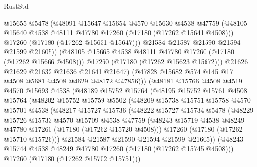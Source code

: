 \begin{lexlean}{RustStd}
\begin{coremodule}
{\begin{coremodule}
{{{{{{{{{{{{{{{{{{{{{{{{{{{{{{{{{{{{{{{{{{{{{{{{{{{{{{{                      @15655
                      @5478
                      (@48091
                        @15647
                        @15654
                        @4570
                        @15630
                        @4538
                        @47759
                        (@48105 @15640 @4538 @48111 @47780 @17260 (@17180 (@17262 @15641 @4508)))
                        @17260
                        (@17180 (@17262 @15631 @15647)))
                      @21584
                      @21587
                      @21590
                      @21594
                      @21599
                      @21605))
                  (@48105 @15665 @4538 @48111 @47780 @17260 (@17180 (@17262 @15666 @4508)))
                  @17260
                  (@17180 (@17262 @15623 @15672)))
                @21626
                @21629
                @21632
                @21636
                @21641
                @21647)
              (@47828 @15682 @574 @145 @17 @4508 @5681 @4508 @4629 @48172 @47856)))
          (@48181
            @15766
            @4508
            @4519
            @4570
            @15693
            @4538
            (@48189
              @15752
              @15764
              (@48195
                @15752
                @15761
                @4508
                @15764
                (@48202
                  @15752
                  @15759
                  @5502
                  (@48209
                    @15738
                    @15751
                    @15758
                    @4570
                    @15701
                    @4538
                    (@48217
                      @15727
                      @15736
                      (@48222
                        @15727
                        @15734
                        @5478
                        (@48229
                          @15726
                          @15733
                          @4570
                          @15709
                          @4538
                          @47759
                          (@48243 @15719 @4538 @48249 @47780 @17260 (@17180 (@17262 @15720 @4508)))
                          @17260
                          (@17180 (@17262 @15710 @15726)))
                        @21584
                        @21587
                        @21590
                        @21594
                        @21599
                        @21605))
                    (@48243 @15744 @4538 @48249 @47780 @17260 (@17180 (@17262 @15745 @4508)))
                    @17260
                    (@17180 (@17262 @15702 @15751)))
}}}}}}}}}}}}}}}}}}}}}}}}}}}}}}}}}}}}}}}}}}}}}}}}}}}}}}}
\end{coremodule}}
\end{coremodule}
\end{lexlean}
